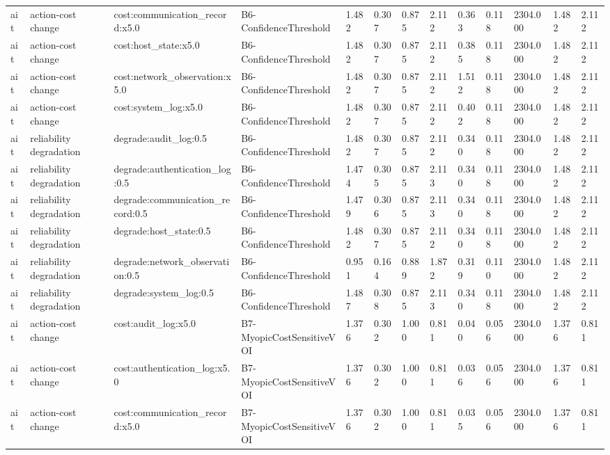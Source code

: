 \begin{table}[!ht]
{\begin{tabular}{lllllllllllll}
ait & action-cost change & cost:communication\_record:x5.0 & B6-ConfidenceThreshold & 1.482 & 0.307 & 0.875 & 2.112 & 0.363 & 0.118 & 2304.000 & 1.482 & 2.112 \\
ait & action-cost change & cost:host\_state:x5.0 & B6-ConfidenceThreshold & 1.482 & 0.307 & 0.875 & 2.112 & 0.385 & 0.118 & 2304.000 & 1.482 & 2.112 \\
ait & action-cost change & cost:network\_observation:x5.0 & B6-ConfidenceThreshold & 1.482 & 0.307 & 0.875 & 2.112 & 1.512 & 0.118 & 2304.000 & 1.482 & 2.112 \\
ait & action-cost change & cost:system\_log:x5.0 & B6-ConfidenceThreshold & 1.482 & 0.307 & 0.875 & 2.112 & 0.402 & 0.118 & 2304.000 & 1.482 & 2.112 \\
ait & reliability degradation & degrade:audit\_log:0.5 & B6-ConfidenceThreshold & 1.482 & 0.307 & 0.875 & 2.112 & 0.340 & 0.118 & 2304.000 & 1.482 & 2.112 \\
ait & reliability degradation & degrade:authentication\_log:0.5 & B6-ConfidenceThreshold & 1.474 & 0.305 & 0.875 & 2.113 & 0.340 & 0.118 & 2304.000 & 1.482 & 2.112 \\
ait & reliability degradation & degrade:communication\_record:0.5 & B6-ConfidenceThreshold & 1.479 & 0.306 & 0.875 & 2.113 & 0.340 & 0.118 & 2304.000 & 1.482 & 2.112 \\
ait & reliability degradation & degrade:host\_state:0.5 & B6-ConfidenceThreshold & 1.482 & 0.307 & 0.875 & 2.112 & 0.340 & 0.118 & 2304.000 & 1.482 & 2.112 \\
ait & reliability degradation & degrade:network\_observation:0.5 & B6-ConfidenceThreshold & 0.951 & 0.164 & 0.889 & 1.872 & 0.319 & 0.110 & 2304.000 & 1.482 & 2.112 \\
ait & reliability degradation & degrade:system\_log:0.5 & B6-ConfidenceThreshold & 1.487 & 0.308 & 0.875 & 2.113 & 0.340 & 0.118 & 2304.000 & 1.482 & 2.112 \\
ait & action-cost change & cost:audit\_log:x5.0 & B7-MyopicCostSensitiveVOI & 1.376 & 0.302 & 1.000 & 0.811 & 0.040 & 0.056 & 2304.000 & 1.376 & 0.811 \\
ait & action-cost change & cost:authentication\_log:x5.0 & B7-MyopicCostSensitiveVOI & 1.376 & 0.302 & 1.000 & 0.811 & 0.036 & 0.056 & 2304.000 & 1.376 & 0.811 \\
ait & action-cost change & cost:communication\_record:x5.0 & B7-MyopicCostSensitiveVOI & 1.376 & 0.302 & 1.000 & 0.811 & 0.035 & 0.056 & 2304.000 & 1.376 & 0.811 \\

\end{tabular}}
\end{table}
